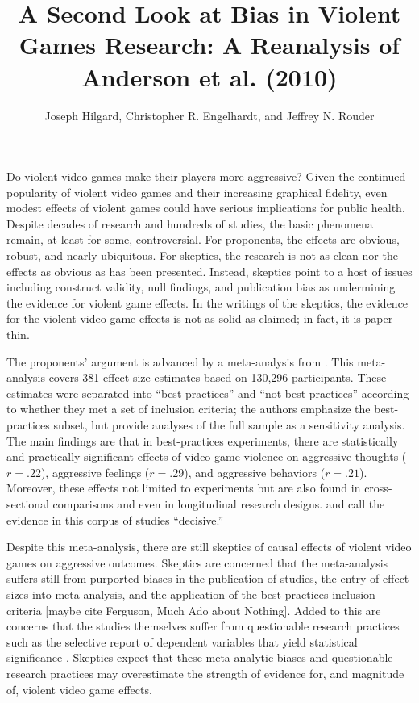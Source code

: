 \documentclass[man]{apa6}
\author{Joseph Hilgard, Christopher R. Engelhardt, and Jeffrey N. Rouder}
\title{A Second Look at Bias in Violent Games Research: A Reanalysis of Anderson et al. (2010)}
\affiliation{University of Missouri}
\begin{document}
\maketitle


Do violent video games make their players more aggressive? Given the continued popularity of violent video games and their increasing graphical fidelity, even modest effects of violent games could have serious implications for public health. Despite decades of research and hundreds of studies, the basic phenomena remain, at least for some, controversial.  For proponents, the effects are obvious, robust, and nearly ubiquitous.  For skeptics, the research is not as clean nor the effects as obvious as has been presented.  Instead, skeptics point to a host of issues including construct validity, null findings, and publication bias as undermining the evidence for violent game effects.  In the writings of the skeptics, the evidence for the violent video game effects is not as solid as claimed; in fact, it is paper thin.

The proponents' argument is advanced by a meta-analysis from \citet{Anderson:etal:2010}.  This meta-analysis covers 381 effect-size estimates based on 130,296 participants.  These estimates were separated into ``best-practices'' and ``not-best-practices'' according to whether they met a set of inclusion criteria; the authors emphasize the best-practices subset, but provide analyses of the full sample as a sensitivity analysis. The main findings are that in best-practices experiments, there are statistically and practically significant effects of video game violence on aggressive thoughts ($r = .22$),  aggressive feelings ($r = .29$), and aggressive behaviors ($r = .21$).  Moreover, these effects not limited to experiments but are also found in cross-sectional comparisons and even in longitudinal research designs. \citet{Bushman:etal:2010} and \citet{Huesmann:2010} call the evidence in this corpus of studies ``decisive.'' 

Despite this meta-analysis, there are still skeptics of causal effects of violent video games on aggressive outcomes.  Skeptics are concerned that the \citet{Anderson:etal:2010} meta-analysis suffers still from purported biases in the publication of studies, the entry of effect sizes into meta-analysis, and the application of the best-practices inclusion criteria [maybe cite Ferguson, Much Ado about Nothing].  Added to this are concerns that the studies themselves suffer from questionable research practices such as the selective report of dependent variables that yield statistical significance \citep{Elson:etal:2014}. Skeptics expect that these meta-analytic biases and questionable research practices may overestimate the strength of evidence for, and magnitude of, violent video game effects.
\end{document}
